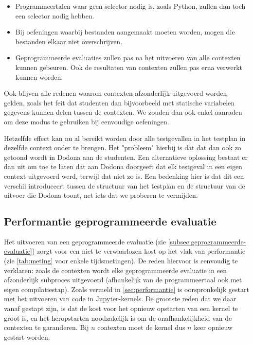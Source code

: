 \begin{itemize}
    \item Programmeertalen waar geen selector nodig is, zoals Python, zullen dan toch een selector nodig hebben.
    \item Bij oefeningen waarbij bestanden aangemaakt moeten worden, mogen die bestanden elkaar niet overschrijven.
    \item Geprogrammeerde evaluaties zullen pas na het uitvoeren van alle contexten kunnen gebeuren.
    Ook de resultaten van contexten zullen pas erna verwerkt kunnen worden.
\end{itemize}

Ook blijven alle redenen waarom contexten afzonderlijk uitgevoerd worden gelden, zoals het feit dat studenten dan bijvoorbeeld met statische variabelen gegevens kunnen delen tussen de contexten.
We zouden dan ook enkel aanraden om deze modus te gebruiken bij eenvoudige oefeningen.

Hetzelfde effect kan nu al bereikt worden door alle testgevallen in het testplan in dezelfde context onder te brengen.
Het "probleem" hierbij is dat dat dan ook zo getoond wordt in Dodona aan de studenten.
Een alternatieve oplossing bestaat er dan uit om toe te laten dat \tested{} aan Dodona doorgeeft dat elk testgeval in een eigen context uitgevoerd werd, terwijl dat niet zo is.
Een bedenking hier is dat dit een verschil introduceert tussen de structuur van het testplan en de structuur van de uitvoer die Dodona toont, net iets dat we proberen te vermijden.

\subsection{Performantie geprogrammeerde evaluatie}\label{subsec:geprogrammeerde-evaluatie-is-traag}

Het uitvoeren van een geprogrammeerde evaluatie (zie \cref{subsec:geprogrammeerde-evaluatie}) zorgt voor een niet te verwaarlozen kost op het vlak van performantie (zie \cref{tab:meting} voor enkele tijdsmetingen).
De reden hiervoor is eenvoudig te verklaren: zoals de contexten wordt elke geprogrammeerde evaluatie in een afzonderlijk subproces uitgevoerd (afhankelijk van de programmeertaal ook met eigen compilatiestap).
Zoals vermeld in \cref{sec:performantie} is \tested{} oorspronkelijk gestart met het uitvoeren van code in Jupyter-kernels.
De grootste reden dat we daar vanaf gestapt zijn, is dat de kost voor het opnieuw opstarten van een kernel te groot is, en het heropstarten noodzakelijk is om de onafhankelijkheid van de contexten te garanderen.
Bij $n$ contexten moet de kernel dus $n$ keer opnieuw gestart worden.

